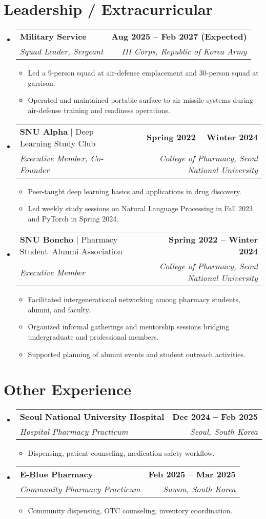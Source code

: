 \documentclass[letterpaper,11pt]{article}
\makeatletter
\newcommand{\resumeItem}[1]{
\item\small{
{#1 \vspace{-2pt}}
}
}
\newcommand{\resumeSubheading}[4]{
\vspace{-2pt}\item
\begin{tabular*}{1.0\textwidth}[t]{l@{\extracolsep{\fill}}r}
\textbf{#1} & \textbf{\small #2} \\
\textit{\small#3} & \textit{\small #4} \\
\end{tabular*}\vspace{-7pt}
}
\newcommand{\resumeSubheadingInlineTwo}[5]{
\vspace{-2pt}\item
\begin{tabular*}{1.0\textwidth}[t]{l@{\extracolsep{\fill}}r}
\textbf{#1} $|$ {#2} & \textbf{\small #3} \\
\textit{\small#4} & \textit{\small #5} \\
\end{tabular*}\vspace{-7pt}
}
\newcommand{\resumeSubHeadingListStart}{\begin{itemize}[leftmargin=0.0in, label={}]}
\newcommand{\resumeSubHeadingListEnd}{\end{itemize}}
\newcommand{\resumeItemListStart}{\begin{itemize}[leftmargin=0.2in]}
\newcommand{\resumeItemListEnd}{\end{itemize}\vspace{-5pt}}
\makeatother
\begin{document}
\section{Leadership / Extracurricular}
\resumeSubHeadingListStart
\resumeSubheading
{Military Service}{Aug 2025 -- Feb 2027 (Expected)}
{Squad Leader, Sergeant}{III Corps, Republic of Korea Army}
\resumeItemListStart
\resumeItem{Led a 9-person squad at air-defense emplacement and 30-person squad at garrison.}
\resumeItem{Operated and maintained portable surface-to-air missile systems during air-defense training and readiness operations.}
\resumeItemListEnd
\resumeSubheadingInlineTwo{SNU Alpha}{Deep Learning Study Club}{Spring 2022 -- Winter 2024}{Executive Member, Co-Founder}{College of Pharmacy, Seoul National University}
\resumeItemListStart
\resumeItem{Peer-taught deep learning basics and applications in drug discovery.}
\resumeItem{Led weekly study sessions on Natural Language Processing in Fall 2023 and PyTorch in Spring 2024.}
\resumeItemListEnd
\resumeSubheadingInlineTwo{SNU Boncho}{Pharmacy Student–Alumni Association}{Spring 2022 -- Winter 2024}{Executive Member}{College of Pharmacy, Seoul National University}
\resumeItemListStart
\resumeItem{Facilitated intergenerational networking among pharmacy students, alumni, and faculty.}
\resumeItem{Organized informal gatherings and mentorship sessions bridging undergraduate and professional members.}
\resumeItem{Supported planning of alumni events and student outreach activities.}
\resumeItemListEnd
\resumeSubHeadingListEnd

\section{Other Experience}
\resumeSubHeadingListStart
\resumeSubheading
{Seoul National University Hospital}{Dec 2024 -- Feb 2025}
{Hospital Pharmacy Practicum}{Seoul, South Korea}
\resumeItemListStart
\resumeItem{Dispensing, patient counseling, medication safety workflow.}
\resumeItemListEnd
\resumeSubheading
{E-Blue Pharmacy}{Feb 2025 -- Mar 2025}
{Community Pharmacy Practicum}{Suwon, South Korea}
\resumeItemListStart
\resumeItem{Community dispensing, OTC counseling, inventory coordination.}
\resumeItemListEnd
\resumeSubHeadingListEnd



\end{document}
